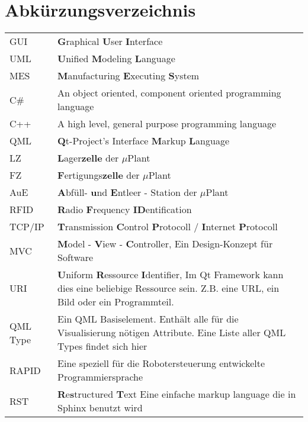 \chapter*{Abkürzungsverzeichnis}

\begin{center}
	
	\renewcommand{\arraystretch}{1.1}
	
	\begin{supertabular}{p{2.1cm}p{10.9cm}}
		GUI				& \textbf{G}raphical \textbf{U}ser \textbf{I}nterface \\
		UML				& \textbf{U}nified \textbf{M}odeling \textbf{L}anguage \\
		MES				& \textbf{M}anufacturing \textbf{E}xecuting \textbf{S}ystem\\
		C\#				& An object oriented, component oriented programming language\\
		C++				& A high level, general purpose programming language\\
		QML				& \textbf{Q}t-Project's Interface \textbf{M}arkup \textbf{L}anguage\\
		LZ				& \textbf{L}ager\textbf{zelle} der $\mu$Plant\\
		FZ				& \textbf{F}ertigungs\textbf{zelle} der $\mu$Plant \\
		AuE				& \textbf{A}bfüll- \textbf{u}nd \textbf{E}ntleer - Station der $\mu$Plant \\
		RFID			& \textbf{R}adio \textbf{F}requency \textbf{ID}entification\\
		TCP/IP			& \textbf{T}ransmission \textbf{C}ontrol \textbf{P}rotocoll / \textbf{I}nternet \textbf{P}rotocoll\\
		MVC				& \textbf{M}odel - \textbf{V}iew - \textbf{C}ontroller, Ein Design-Konzept für Software\\
		URI				& \textbf{U}niform \textbf{R}essource \textbf{I}dentifier, Im Qt Framework kann dies eine beliebige
						  Ressource sein. Z.B. eine URL, ein Bild oder ein Programmteil. \\
		QML Type		& Ein QML Basiselement. Enthält alle für die Visualisierung nötigen Attribute. Eine Liste
						  aller QML Types findet sich hier \cite{qmlTypeList}\\
		RAPID			& Eine speziell für die Robotersteuerung entwickelte Programmiersprache\\
		RST				& \textbf{R}e\textbf{s}tructured \textbf{T}ext Eine einfache markup language die in Sphinx benutzt wird\\
	\end{supertabular}

\end{center}